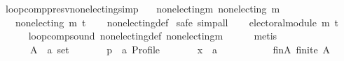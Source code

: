 \begin{isabellebody}
\isamarkupfalse%
%
\endisatagproof
{\isafoldproof}%
%
\isadelimproof
\isanewline
%
\endisadelimproof
\isanewline
\isanewline
{}\isamarkupfalse%
\ loop{\isacharunderscore}{\kern0pt}comp{\isacharunderscore}{\kern0pt}presv{\isacharunderscore}{\kern0pt}non{\isacharunderscore}{\kern0pt}electing{\isacharbrackleft}{\kern0pt}simp{\isacharbrackright}{\kern0pt}{\isacharcolon}{\kern0pt}\isanewline
\ \ \ non{\isacharunderscore}{\kern0pt}electing{\isacharunderscore}{\kern0pt}m{\isacharcolon}{\kern0pt}\ {\isachardoublequoteopen}non{\isacharunderscore}{\kern0pt}electing\ m{\isachardoublequoteclose}\isanewline
\ \ \ {\isachardoublequoteopen}non{\isacharunderscore}{\kern0pt}electing\ {\isacharparenleft}{\kern0pt}m\ {\isasymcirclearrowleft}\isactrlsub t{\isacharparenright}{\kern0pt}{\isachardoublequoteclose}\isanewline
%
\isadelimproof
\ \ %
\endisadelimproof
%
\isatagproof
{}\isamarkupfalse%
\ non{\isacharunderscore}{\kern0pt}electing{\isacharunderscore}{\kern0pt}def\isanewline
{}\isamarkupfalse%
\ {\isacharparenleft}{\kern0pt}safe{\isacharcomma}{\kern0pt}\ simp{\isacharunderscore}{\kern0pt}all{\isacharparenright}{\kern0pt}\isanewline
\ \ \isamarkupfalse%
\ {\isachardoublequoteopen}electoral{\isacharunderscore}{\kern0pt}module\ {\isacharparenleft}{\kern0pt}m\ {\isasymcirclearrowleft}\isactrlsub t{\isacharparenright}{\kern0pt}{\isachardoublequoteclose}\isanewline
\ \ \ \ \isamarkupfalse%
\ loop{\isacharunderscore}{\kern0pt}comp{\isacharunderscore}{\kern0pt}sound\ non{\isacharunderscore}{\kern0pt}electing{\isacharunderscore}{\kern0pt}def\ non{\isacharunderscore}{\kern0pt}electing{\isacharunderscore}{\kern0pt}m\isanewline
\ \ \ \ \isamarkupfalse%
\ metis\isanewline
{}\isamarkupfalse%
\isanewline
\ \ \ \ \isamarkupfalse%
\isanewline
\ \ \ \ \ \ A\ {\isacharcolon}{\kern0pt}{\isacharcolon}{\kern0pt}\ {\isachardoublequoteopen}{\isacharprime}{\kern0pt}a\ set{\isachardoublequoteclose}\ \isanewline
\ \ \ \ \ \ p\ {\isacharcolon}{\kern0pt}{\isacharcolon}{\kern0pt}\ {\isachardoublequoteopen}{\isacharprime}{\kern0pt}a\ Profile{\isachardoublequoteclose}\ \isanewline
\ \ \ \ \ \ x\ {\isacharcolon}{\kern0pt}{\isacharcolon}{\kern0pt}\ {\isachardoublequoteopen}{\isacharprime}{\kern0pt}a{\isachardoublequoteclose}\isanewline
\ \ \ \ \isamarkupfalse%
\isanewline
\ \ \ \ \ \ fin{\isacharunderscore}{\kern0pt}A{\isacharcolon}{\kern0pt}\ {\isachardoublequoteopen}finite\ A{\isachardoublequoteclose}\ \isanewline

\end{isabellebody}
